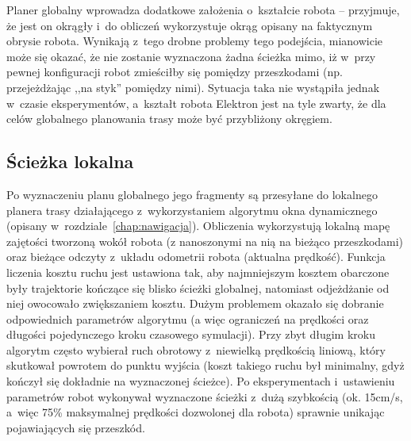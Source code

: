 Planer globalny wprowadza dodatkowe założenia o~kształcie robota -- przyjmuje, że
jest on okrągły i~do obliczeń wykorzystuje okrąg opisany na faktycznym obrysie robota.
Wynikają z~tego drobne problemy tego podejścia, mianowicie może się okazać, że nie
zostanie wyznaczona żadna ścieżka mimo, iż w~przy pewnej konfiguracji robot zmieściłby
się pomiędzy przeszkodami (np. przejeżdżając ,,na styk'' pomiędzy nimi). Sytuacja
taka nie wystąpiła jednak w~czasie eksperymentów, a~kształt robota Elektron jest
na tyle zwarty, że dla celów globalnego planowania trasy może być przybliżony okręgiem.

\subsection{Ścieżka lokalna}

Po wyznaczeniu planu globalnego jego fragmenty są przesyłane do lokalnego planera
trasy działającego z~wykorzystaniem algorytmu okna dynamicznego (opisany
w~rozdziale~\ref{chap:nawigacja}). Obliczenia wykorzystują lokalną mapę zajętości
tworzoną wokół robota (z nanoszonymi na nią na bieżąco przeszkodami) oraz
bieżące odczyty z~układu odometrii robota (aktualna prędkość).
Funkcja liczenia kosztu ruchu jest ustawiona tak,
aby najmniejszym kosztem obarczone były trajektorie kończące się blisko ścieżki globalnej,
natomiast odjeżdżanie od niej owocowało zwiększaniem kosztu. Dużym problemem okazało
się dobranie odpowiednich parametrów algorytmu (a więc ograniczeń na prędkości
oraz długości pojedynczego kroku czasowego symulacji). Przy zbyt długim kroku
algorytm często wybierał ruch obrotowy z~niewielką prędkością liniową, który skutkował
powrotem do punktu wyjścia (koszt takiego ruchu był minimalny, gdyż kończył się dokładnie
na wyznaczonej ścieżce). Po eksperymentach i~ustawieniu parametrów robot wykonywał
wyznaczone ścieżki z~dużą szybkością (ok. 15cm/s, a~więc 75\% maksymalnej prędkości
dozwolonej dla robota) sprawnie unikając pojawiających się przeszkód.
